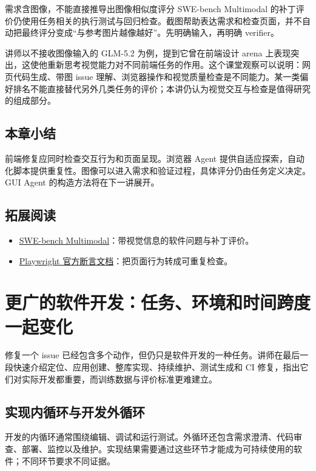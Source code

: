 \documentclass[11pt,a4paper]{article}
\begin{document}
\begin{importantbox}{需求含图像，不能直接推导出图像相似度评分}
SWE-bench Multimodal 的补丁评价仍使用任务相关的执行测试与回归检查。截图帮助表达需求和检查页面，并不自动把最终评分变成“与参考图片越像越好”。先明确输入，再明确 verifier。
\end{importantbox}

讲师以不接收图像输入的 GLM-5.2 为例，提到它曾在前端设计 arena 上表现突出，这使他重新思考视觉能力对不同前端任务的作用。这个课堂观察可以说明：网页代码生成、带图 issue 理解、浏览器操作和视觉质量检查是不同能力。某一类偏好排名不能直接替代另外几类任务的评价；本讲仍认为视觉交互与检查是值得研究的组成部分。

\subsection{本章小结}
前端修复应同时检查交互行为和页面呈现。浏览器 Agent 提供自适应探索，自动化脚本提供重复性。图像可以进入需求和验证过程，具体评分仍由任务定义决定。GUI Agent 的构造方法将在下一讲展开。

\subsection{拓展阅读}
\begin{itemize}
\item \href{https://arxiv.org/abs/2410.03859}{SWE-bench Multimodal}：带视觉信息的软件问题与补丁评价。
\item \href{https://playwright.dev/python/docs/test-assertions}{Playwright 官方断言文档}：把页面行为转成可重复检查。
\end{itemize}

\clearpage
\section{更广的软件开发：任务、环境和时间跨度一起变化}

修复一个 issue 已经包含多个动作，但仍只是软件开发的一种任务。讲师在最后一段快速介绍定位、应用创建、整库实现、持续维护、测试生成和 CI 修复，指出它们对实际开发都重要，而训练数据与评价标准更难建立。

\subsection{实现内循环与开发外循环}
开发的内循环通常围绕编辑、调试和运行测试。外循环还包含需求澄清、代码审查、部署、监控以及维护。实现结果需要通过这些环节才能成为可持续使用的软件；不同环节要求不同证据。
\end{document}

